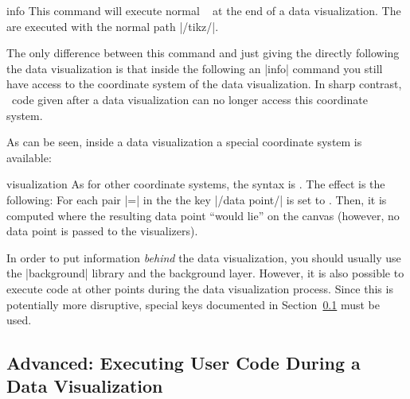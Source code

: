 \begin{datavisualizationoperation}{info}{}
  This command will execute normal \tikzname\  at the end
  of a data visualization. The  are executed with the
  normal path |/tikz/|.

  The only difference between this command and just giving the
   directly following the data visualization is that inside
  the  following an |info| command you still have access
  to the coordinate system of the data visualization. In sharp
  contrast, \tikzname\ code given after a data visualization can no
  longer access this coordinate system.


\begin{codeexample}[]
\end{codeexample}  

  As can be seen, inside a data visualization a special coordinate
  system is available:

  \begin{coordinatesystem}{visualization}
    As for other coordinate systems, the syntax is
    . The effect is the following:
    For each pair |=| in the 
    the key |/data point/| is set to
    . Then, it is computed where the resulting data point
    ``would lie'' on the canvas (however, no data point is passed to
    the visualizers). 
  \end{coordinatesystem}
\end{datavisualizationoperation}

In order to put information \emph{behind} the data visualization,
you should usually use the |background| library and the background
layer. However, it is also possible to execute code at other points
during the data visualization process. Since this is potentially
more disruptive, special keys documented in
Section~\ref{section-dv-user-code} must be used.



\subsection{Advanced: Executing User Code During a Data Visualization}
\label{section-dv-user-code}


